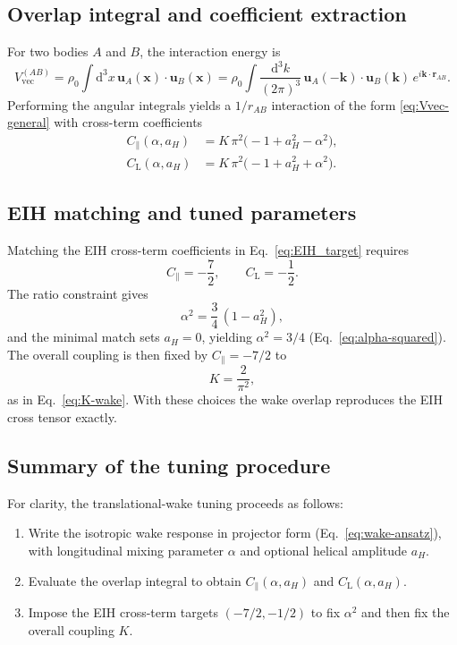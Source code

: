 \documentclass[11pt]{article}
\newcommand{\dd}{\mathrm{d}}
\begin{document}
\subsection{Overlap integral and coefficient extraction}

For two bodies $A$ and $B$, the interaction energy is
\begin{equation}
  V_{\text{vec}}^{(AB)}
  = \rho_0 \int \dd^3 x\,
    \mathbf{u}_A(\mathbf{x})\cdot\mathbf{u}_B(\mathbf{x})
  =
  \rho_0 \int \frac{\dd^3 k}{(2\pi)^3}\,
    \mathbf{u}_A(-\mathbf{k})\cdot\mathbf{u}_B(\mathbf{k})\,
    e^{i\mathbf{k}\cdot\mathbf{r}_{AB}}.
\end{equation}
Performing the angular integrals yields a $1/r_{AB}$ interaction of the form
\eqref{eq:Vvec-general} with cross-term coefficients
\begin{align}
  C_\parallel(\alpha,a_H) &= K\,\pi^2\bigl(-1 + a_H^2 - \alpha^2\bigr),
  \\
  C_{\text{L}}(\alpha,a_H) &= K\,\pi^2\bigl(-1 + a_H^2 + \alpha^2\bigr).
\end{align}

\subsection{EIH matching and tuned parameters}

Matching the EIH cross-term coefficients in Eq.~\eqref{eq:EIH_target} requires
\begin{equation}
  C_\parallel=-\frac{7}{2},
  \qquad
  C_{\text{L}}=-\frac{1}{2}.
\end{equation}
The ratio constraint gives
\begin{equation}
  \alpha^2=\frac{3}{4}\,(1-a_H^2),
\end{equation}
and the minimal match sets $a_H=0$, yielding $\alpha^2=3/4$
(Eq.~\eqref{eq:alpha-squared}).
The overall coupling is then fixed by $C_\parallel=-7/2$ to
\begin{equation}
  K=\frac{2}{\pi^2},
\end{equation}
as in Eq.~\eqref{eq:K-wake}.
With these choices the wake overlap reproduces the EIH cross tensor exactly.

\subsection{Summary of the tuning procedure}

For clarity, the translational-wake tuning proceeds as follows:
\begin{enumerate}
  \item Write the isotropic wake response in projector form
        (Eq.~\eqref{eq:wake-ansatz}), with longitudinal mixing parameter $\alpha$
        and optional helical amplitude $a_H$.
  \item Evaluate the overlap integral to obtain $C_\parallel(\alpha,a_H)$ and
        $C_{\text{L}}(\alpha,a_H)$.
  \item Impose the EIH cross-term targets $(-7/2,-1/2)$ to fix $\alpha^2$ and
        then fix the overall coupling $K$.
\end{enumerate}
\end{document}
